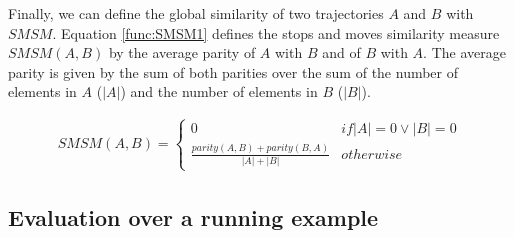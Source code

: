 Finally, we can define the global similarity of two trajectories $A$ and $B$ with $SMSM$. Equation \ref{func:SMSM1} defines the stops and moves similarity measure $SMSM(A,B)$ by the average parity of $A$ with $B$ and of $B$ with $A$. {The average parity is given by the sum of both parities over the sum of the number of elements in $A$ ($|A|$) and the number of elements in $B$ ($|B|$).}

\begin{equation}
\label{func:SMSM1}
\begin{split}
  SMSM(A, B) = 
  \begin{cases} 
      0 & if  |A| = 0 \vee |B| = 0 \\
      \frac{parity(A, B) + parity(B, A)}{|A| + |B|} & otherwise
  \end{cases}
\end{split}
\end{equation}



\subsection{Evaluation over a running example}

